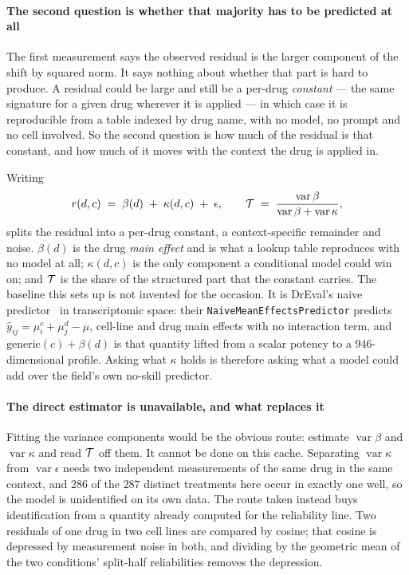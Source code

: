 


\paragraph{The second question is whether that majority has to be predicted at all}
The first measurement says the observed residual is the larger component of the
shift by squared norm. It says nothing about whether that part is hard to produce.
A residual could be large and still be a per-drug \emph{constant} --- the same
signature for a given drug wherever it is applied --- in which case it is
reproducible from a table indexed by drug name, with no model, no prompt and no
cell involved. So the second question is how much of the residual is that
constant, and how much of it moves with the context the drug is applied in.

Writing
\begin{equation}
 r(d,c) \;=\; \beta(d) \;+\; \kappa(d,c) \;+\; \epsilon,
 \qquad
 \mathcal{T} \;=\; \frac{\operatorname{var}\beta}{\operatorname{var}\beta + \operatorname{var}\kappa},
\end{equation}
splits the residual into a per-drug constant, a context-specific remainder and
noise. $\beta(d)$ is the drug \emph{main effect} and is what a lookup table
reproduces with no model at all; $\kappa(d,c)$ is the only component a conditional model could win
on; and $\mathcal{T}$ is the share of the structured part that the constant carries.
The baseline this sets up is not invented for the occasion. It is DrEval's naive
predictor~\cite{dreval} in transcriptomic space: their
\texttt{NaiveMeanEffectsPredictor} predicts $\hat{y}_{ij} = \mu^c_i + \mu^d_j -
\mu$, cell-line and drug main effects with no interaction term, and
$\textrm{generic}(c) + \beta(d)$ is that quantity lifted from a scalar potency to a
$946$-dimensional profile. Asking what $\kappa$ holds is therefore asking what a
model could add over the field's own no-skill predictor.

\paragraph{The direct estimator is unavailable, and what replaces it}
Fitting the variance components would be the obvious route: estimate
$\operatorname{var}\beta$ and $\operatorname{var}\kappa$ and read $\mathcal{T}$ off
them. It cannot be done on this cache. Separating $\operatorname{var}\kappa$ from
$\operatorname{var}\epsilon$ needs two independent measurements of the same drug in
the same context, and $\num{286}$ of the $\num{287}$ distinct treatments here occur
in exactly one well, so the model is unidentified on its own data. The route taken
instead buys identification from a quantity already computed for the reliability
line. Two residuals of one drug in two cell lines are compared by cosine; that
cosine is depressed by measurement noise in both, and dividing by the geometric
mean of the two conditions' split-half reliabilities removes the depression.

